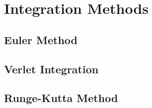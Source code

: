 \section{Integration Methods}
\subsection{Euler Method}

\subsection{Verlet Integration}

\subsection{Runge-Kutta Method}
